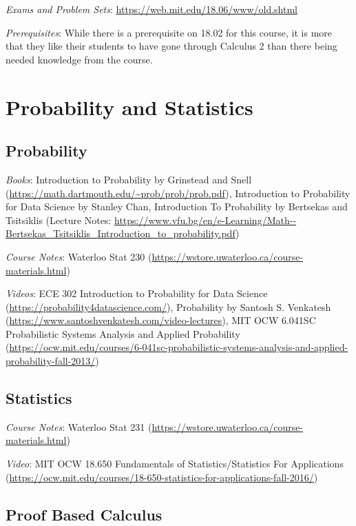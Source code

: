\documentclass[openany,10pt]{book}
\begin{document}
\noindent \textit{Exams and Problem Sets}: \url{https://web.mit.edu/18.06/www/old.shtml}

\noindent \textit{Prerequisites}: While there is a prerequisite on 18.02 for this course, it is more that they like their students to have gone through Calculus 2 than there being needed knowledge from the course.

\part{Probability and Statistics}

\chapter{Probability}

\textit{Books}: Introduction to Probability by Grinstead and Snell (\url{https://math.dartmouth.edu/~prob/prob/prob.pdf}), Introduction to Probability for Data Science by Stanley Chan, Introduction To Probability by Bertsekas and Tsitsiklis (Lecture Notes: \url{https://www.vfu.bg/en/e-Learning/Math--Bertsekas\_Tsitsiklis\_Introduction\_to\_probability.pdf})\newline

\noindent \textit{Course Notes}: Waterloo Stat 230 (\url{https://wstore.uwaterloo.ca/course-materials.html})\newline

\noindent \textit{Videos}: ECE 302 Introduction to Probability for Data Science (\url{https://probability4datascience.com/}), Probability by Santosh S. Venkatesh (\url{https://www.santoshvenkatesh.com/video-lectures}), MIT OCW 6.041SC Probabilistic Systems Analysis and Applied Probability (\url{https://ocw.mit.edu/courses/6-041sc-probabilistic-systems-analysis-and-applied-probability-fall-2013/})\newline

\chapter{Statistics}

\textit{Course Notes}: Waterloo Stat 231 (\url{https://wstore.uwaterloo.ca/course-materials.html})

\noindent \textit{Video}: MIT OCW 18.650 Fundamentals of Statistics/Statistics For Applications (\url{https://ocw.mit.edu/courses/18-650-statistics-for-applications-fall-2016/})

\chapter{Proof Based Calculus}
\end{document}
